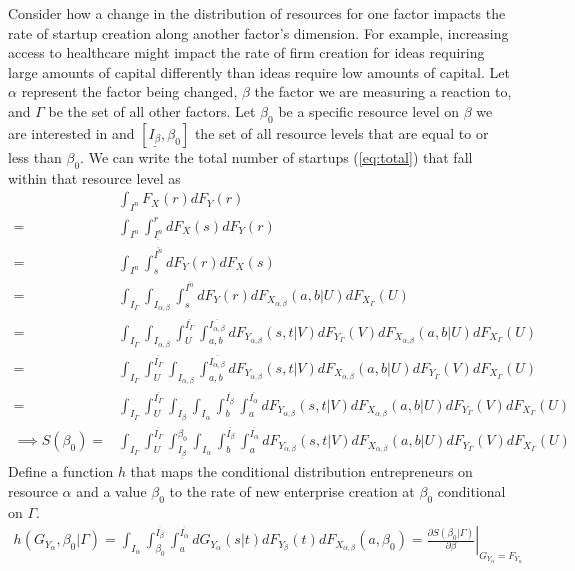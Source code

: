 \documentclass[12pt]{article}
\begin{document}
Consider how a change in the distribution of resources for one factor impacts the rate of startup creation along another factor's dimension. For example, increasing access to healthcare might impact the rate of firm creation for ideas requiring large amounts of capital differently than ideas require low amounts of capital. Let $\alpha$ represent the factor being changed, $\beta$ the factor we are measuring a reaction to, and $\Gamma$ be the set of all other factors. Let $\beta_0$ be a specific resource level on $\beta$ we are interested in and $[\underline{I_\beta}, \beta_0]$ the set of all resource levels that are equal to or less than $\beta_0$. We can write the total number of startups (\ref{eq:total}) that fall within that resource level as
\begin{align*}
& \int_{I^n} F_X(r) dF_Y(r)\\
= & \int_{I^n} \int_{\underline{I^n}}^{r} dF_X(s) dF_Y(r)\\
= & \int_{I^n} \int_{s}^{\overline{I^n}}  dF_Y(r) dF_X(s) \\
= &  \int_{I_{\Gamma}} \int_{I_{\alpha,\beta}} \int_{s}^{\overline{I^n}}  dF_Y(r)dF_{X_{\alpha,\beta}}(a,b|U)
 dF_{X_{\Gamma}}(U)\\
= &  \int_{I_{\Gamma}} \int_{I_{\alpha,\beta}} \int_{U}^{\overline{I_\Gamma}} \int_{a,b}^{\overline{I_{\alpha,\beta}}} dF_{Y_{\alpha,\beta}}(s,t|V)dF_{Y_\Gamma}(V) dF_{X_{\alpha,\beta}}(a,b|U) dF_{X_{\Gamma}}(U)\\
= &  \int_{I_{\Gamma}} \int_{U}^{\overline{I_\Gamma}} \int_{I_{\alpha,\beta}} \int_{a,b}^{\overline{I_{\alpha,\beta}}} dF_{Y_{\alpha,\beta}}(s,t|V) dF_{X_{\alpha,\beta}}(a,b|U) dF_{Y_\Gamma}(V) dF_{X_{\Gamma}}(U)\\
= &  \int_{I_{\Gamma}} \int_{U}^{\overline{I_\Gamma}} \int_{I_{\beta}} \int_{I_{\alpha}} \int_{b}^{\overline{I_{\beta}}} \int_{a}^{\overline{I_{\alpha}}} dF_{Y_{\alpha,\beta}}(s,t|V) dF_{X_{\alpha,\beta}}(a,b|U) dF_{Y_\Gamma}(V) dF_{X_{\Gamma}}(U)\\
\implies S(\beta_0) = & \int_{I_{\Gamma}} \int_{U}^{\overline{I_\Gamma}} \int_{\underline{I_\beta}}^{\beta_0} \int_{I_{\alpha}} \int_{b}^{\overline{I_{\beta}}} \int_{a}^{\overline{I_{\alpha}}} dF_{Y_{\alpha,\beta}}(s,t|V) dF_{X_{\alpha,\beta}}(a,b|U) dF_{Y_\Gamma}(V) dF_{X_{\Gamma}}(U)
\end{align*}
Define a function $h$ that maps the conditional distribution entrepreneurs on resource $\alpha$ and a value $\beta_0$ to the rate of new enterprise creation at $\beta_0$ conditional on $\Gamma$.
\begin{align*}
h(G_{Y_\alpha},\beta_0|\Gamma) = \int_{I_{\alpha}} \int_{\beta_0}^{\overline{I_{\beta}}} \int_{a}^{\overline{I_{\alpha}}} dG_{Y_{\alpha}}(s|t) dF_{Y_{\beta}}(t) dF_{X_{\alpha,\beta}}(a,\beta_0) = \left. \frac{\partial S (\beta_0|\Gamma)}{\partial \beta} \right|_{G_{Y_{\alpha}}=F_{Y_{\alpha}}}
\end{align*}
\end{document}
